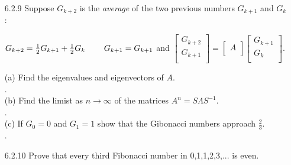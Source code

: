 \documentclass[10pt,twoside,reqno]{article}
\begin{document}
\begin{enumerate}
\vspace{3mm}
\item[6.2.9] Suppose $G_{k+2}$ is the \textit{average} of the two previous numbers $G_{k+1}$ and $G_k$: \\ 
\begin{center}
$G_{k+2}=\frac{1}{2}G_{k+1}+\frac{1}{2}G_k \hspace{8mm} G_{k+1}=G_{k+1}$
\hspace{10mm} and \hspace{10mm}
$
\begin{bmatrix}
G_{k+2}\\
G_{k+1}\\
\end{bmatrix}
=
\begin{bmatrix}
A\\
\end{bmatrix}
\begin{bmatrix}
G_{k+1}\\
G_k\\
\end{bmatrix}
$. \\
\end{center}
\vspace{2mm}
{\addtolength{\leftskip}{10mm}
(a) Find the eigenvalues and eigenvectors of $A$. \\ \vspace{2mm}
{\addtolength{\leftskip}{5mm}
. \\
}
\vspace{3mm}
(b) Find the limist as $n \rightarrow \infty$ of the matrices $A^n=S \Lambda S^{-1}$. \\ \vspace{2mm}
{\addtolength{\leftskip}{5mm}
. \\
}
\vspace{3mm}
(c) If $G_0=0$ and $G_1=1$ show that the Gibonacci numbers approach $\frac{2}{3}$. \\ \vspace{2mm}
{\addtolength{\leftskip}{5mm}
. \\
}
\vspace{3mm}
}
\item[6.2.10] Prove that every third Fibonacci number in 0,1,1,2,3,... is even.\\ \vspace{2mm}



\end{enumerate}
\end{document}
